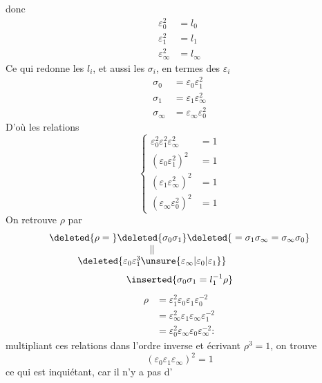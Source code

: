 donc
\[
\begin{aligned}
\varepsilon_0^2&=l_0\\
\varepsilon_1^2&=l_1\\
\varepsilon_\infty^2&=l_\infty
\end{aligned}
\]
Ce qui redonne les $l_i$, et aussi les $\sigma_i$,  en termes des $\varepsilon_i$
\[
\begin{aligned}
\sigma_0&=\varepsilon_0\varepsilon_1^2\\
\sigma_1&=\varepsilon_1\varepsilon_\infty^2\\
\sigma_\infty&=\varepsilon_\infty\varepsilon_0^2
\end{aligned}
\]
D'où les relations
\[
\left\{\begin{aligned}
\varepsilon_0^2\varepsilon_1^2\varepsilon_\infty^2&=1\\
(\varepsilon_0\varepsilon_1^2)^2&=1\\
(\varepsilon_1\varepsilon_\infty^2)^2&=1\\
(\varepsilon_\infty\varepsilon_0^2)^2&=1
\end{aligned}\right.
\]
On retrouve $\rho$  par
\[
\begin{array}{r@{}c@{}l}
\deleted{\rho={}}&\deleted{\sigma_0\sigma_1}&\deleted{{}=\sigma_1\sigma_\infty=\sigma_\infty\sigma_0}\\
&\Vert&\\
&\makebox[0pt][c]{$\deleted{\varepsilon_0\varepsilon_1^3\unsure{\varepsilon_\infty|\varepsilon_0|\varepsilon_1}}$}&
\end{array}
\]
\[
\inserted{\sigma_0\sigma_1=l_1^{-1}\rho}
\]
\[
\begin{aligned}
\rho&=\varepsilon_1^2\varepsilon_0\varepsilon_1\varepsilon_0^{-2}\\
&=\varepsilon_\infty^2\varepsilon_1\varepsilon_\infty\varepsilon_1^{-2}\\
&=\varepsilon_0^2\varepsilon_\infty\varepsilon_0\varepsilon_\infty^{-2}:
\end{aligned}
\]
multipliant  ces relations dans l'ordre inverse et écrivant $\rho^3=1$, on trouve
\[
(\varepsilon_0\varepsilon_1\varepsilon_\infty)^2=1
\]
ce qui est inquiétant, car il n'y a pas d'

